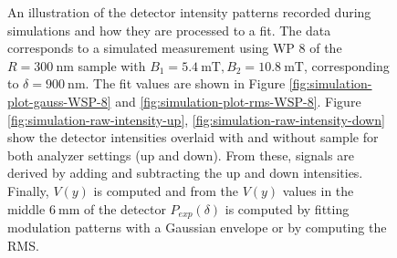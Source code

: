 \begin{figure}[htbp]
	\caption{An illustration of the detector intensity patterns recorded during simulations and how they are processed to a fit. The data corresponds to a simulated measurement using WP 8 of the $R = \SI{300}{\nano\meter}$ sample with $B_1 = \SI{5.4}{\milli\tesla}, B_2 = \SI{10.8}{\milli\tesla}$, corresponding to $\delta = \SI{900}{\nano\meter}$. The fit values are shown in Figure \ref{fig:simulation-plot-gauss-WSP-8} and \ref{fig:simulation-plot-rms-WSP-8}. Figure \ref{fig:simulation-raw-intensity-up}, \ref{fig:simulation-raw-intensity-down} show the detector intensities overlaid with and without sample for both analyzer settings (up and down). From these, signals are derived by adding and subtracting the up and down intensities. Finally, $V(y)$ is computed and from the $V(y)$ values in the middle $\SI{6}{\milli\meter}$ of the detector $P_{exp}(\delta)$ is computed by fitting modulation patterns with a Gaussian envelope or by computing the RMS.}
	\label{fig:simulation-raw-intensity}
\end{figure}

